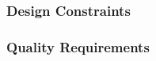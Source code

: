     \subsubsection{Design Constraints}
    \label{requirements:constraints}

    \subsubsection{Quality Requirements}
    \label{requirements:quality}


    \label{requirements:nonfunctional_end}
